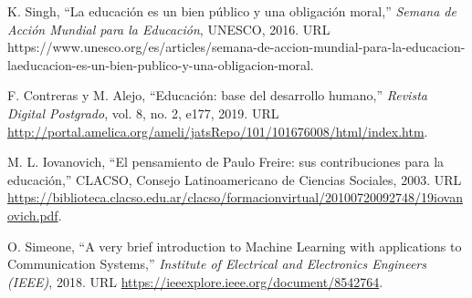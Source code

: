 \documentclass{article}
\begin{document}
\begin{enumerate}[noitemsep, topsep=0pt, parsep=0pt, partopsep=0pt]
{		\item K. Singh, ``La educación es un bien público y una obligación moral,'' \emph{Semana de Acción Mundial para la Educación}, UNESCO, 2016. URL  https://www.unesco.org/es/articles/semana-de-accion-mundial-para-la-educacion-laeducacion-es-un-bien-publico-y-una-obligacion-moral.
		\item F. Contreras y M. Alejo, ``Educación: base del desarrollo humano,'' \emph{Revista Digital Postgrado}, vol. 8, no. 2, e177, 2019. URL  \url{http://portal.amelica.org/ameli/jatsRepo/101/101676008/html/index.htm}.
		\item M. L. Iovanovich, ``El pensamiento de Paulo Freire: sus contribuciones para la educación,'' CLACSO, Consejo Latinoamericano de Ciencias Sociales, 2003. URL  \url{https://biblioteca.clacso.edu.ar/clacso/formacionvirtual/20100720092748/19iovanovich.pdf}.
		\item O. Simeone, ``A very brief introduction to Machine Learning with applications to Communication Systems,'' \emph{Institute of Electrical and Electronics Engineers (IEEE)}, 2018. URL  \url{https://ieeexplore.ieee.org/document/8542764}.
	}
\end{enumerate}





\end{document}
